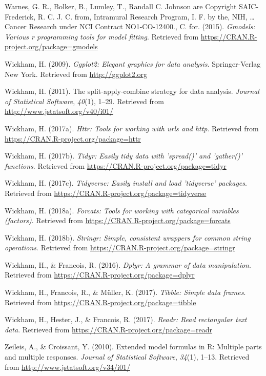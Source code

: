 \documentclass[english,man]{apa6}
\theoremstyle{definition}
\theoremstyle{definition}
\theoremstyle{definition}
\theoremstyle{remark}
\begin{document}
\hypertarget{ref-R-gmodels}{}
Warnes, G. R., Bolker, B., Lumley, T., Randall C. Johnson are Copyright
SAIC-Frederick, R. C. J. C. from, Intramural Research Program, I. F. by
the, NIH, \ldots{} Cancer Research under NCI Contract NO1-CO-12400., C.
for. (2015). \emph{Gmodels: Various r programming tools for model
fitting}. Retrieved from
\url{https://CRAN.R-project.org/package=gmodels}

\hypertarget{ref-R-ggplot2}{}
Wickham, H. (2009). \emph{Ggplot2: Elegant graphics for data analysis}.
Springer-Verlag New York. Retrieved from \url{http://ggplot2.org}

\hypertarget{ref-R-plyr}{}
Wickham, H. (2011). The split-apply-combine strategy for data analysis.
\emph{Journal of Statistical Software}, \emph{40}(1), 1--29. Retrieved
from \url{http://www.jstatsoft.org/v40/i01/}

\hypertarget{ref-R-httr}{}
Wickham, H. (2017a). \emph{Httr: Tools for working with urls and http}.
Retrieved from \url{https://CRAN.R-project.org/package=httr}

\hypertarget{ref-R-tidyr}{}
Wickham, H. (2017b). \emph{Tidyr: Easily tidy data with 'spread()' and
'gather()' functions}. Retrieved from
\url{https://CRAN.R-project.org/package=tidyr}

\hypertarget{ref-R-tidyverse}{}
Wickham, H. (2017c). \emph{Tidyverse: Easily install and load
'tidyverse' packages}. Retrieved from
\url{https://CRAN.R-project.org/package=tidyverse}

\hypertarget{ref-R-forcats}{}
Wickham, H. (2018a). \emph{Forcats: Tools for working with categorical
variables (factors)}. Retrieved from
\url{https://CRAN.R-project.org/package=forcats}

\hypertarget{ref-R-stringr}{}
Wickham, H. (2018b). \emph{Stringr: Simple, consistent wrappers for
common string operations}. Retrieved from
\url{https://CRAN.R-project.org/package=stringr}

\hypertarget{ref-R-dplyr}{}
Wickham, H., \& Francois, R. (2016). \emph{Dplyr: A grammar of data
manipulation}. Retrieved from
\url{https://CRAN.R-project.org/package=dplyr}

\hypertarget{ref-R-tibble}{}
Wickham, H., Francois, R., \& Müller, K. (2017). \emph{Tibble: Simple
data frames}. Retrieved from
\url{https://CRAN.R-project.org/package=tibble}

\hypertarget{ref-R-readr}{}
Wickham, H., Hester, J., \& Francois, R. (2017). \emph{Readr: Read
rectangular text data}. Retrieved from
\url{https://CRAN.R-project.org/package=readr}

\hypertarget{ref-R-Formula}{}
Zeileis, A., \& Croissant, Y. (2010). Extended model formulas in R:
Multiple parts and multiple responses. \emph{Journal of Statistical
Software}, \emph{34}(1), 1--13. Retrieved from
\url{http://www.jstatsoft.org/v34/i01/}
\end{document}
